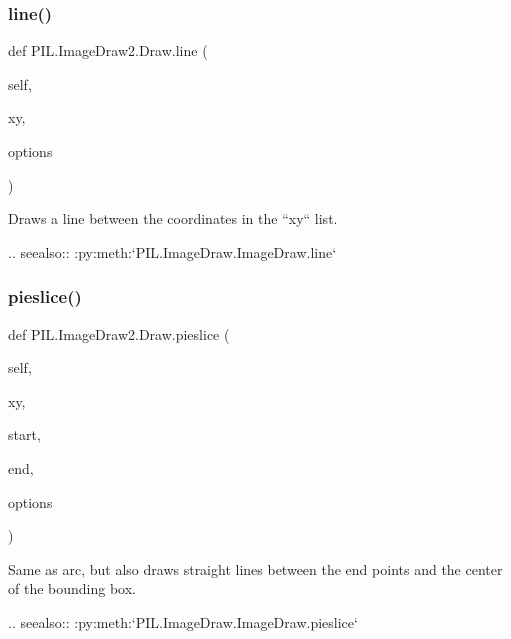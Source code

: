 \subsubsection{\texorpdfstring{line()}{line()}}
{\footnotesize\ttfamily def P\+I\+L.\+Image\+Draw2.\+Draw.\+line (\begin{DoxyParamCaption}\item[{}]{self,  }\item[{}]{xy,  }\item[{}]{options }\end{DoxyParamCaption})}

\begin{DoxyVerb}Draws a line between the coordinates in the ``xy`` list.

.. seealso:: :py:meth:`PIL.ImageDraw.ImageDraw.line`
\end{DoxyVerb}
 \mbox{\label{classPIL_1_1ImageDraw2_1_1Draw_a6ef3c84a11a4be6fd0297b4a8a4d1369}} 
\subsubsection{\texorpdfstring{pieslice()}{pieslice()}}
{\footnotesize\ttfamily def P\+I\+L.\+Image\+Draw2.\+Draw.\+pieslice (\begin{DoxyParamCaption}\item[{}]{self,  }\item[{}]{xy,  }\item[{}]{start,  }\item[{}]{end,  }\item[{}]{options }\end{DoxyParamCaption})}

\begin{DoxyVerb}Same as arc, but also draws straight lines between the end points and the
center of the bounding box.

.. seealso:: :py:meth:`PIL.ImageDraw.ImageDraw.pieslice`
\end{DoxyVerb}
 \mbox{\label{classPIL_1_1ImageDraw2_1_1Draw_aeba64001c9072a9afc063d3a91e4b78f}} 
